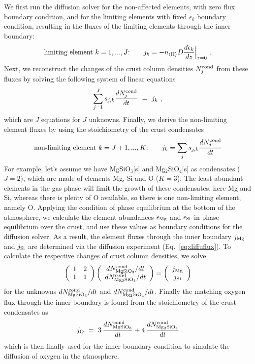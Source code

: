 \documentclass[11pt]{article}
\def\nH{n_{\langle\rm H\rangle}}
\def\ek{\epsilon_k}
\begin{document}
We first run the diffusion solver for the non-affected elements, with
zero flux boundary condition, and for the limiting elements 
with fixed $\ek$ boundary condition, resulting in the fluxes
of the limiting elements through the inner boundary:
\begin{equation}
  \mbox{limiting element $k=1,...,J$:}\quad\quad 
   j_k = -\nH D \frac{d\ek}{dz}\Big|_{z=0} \ .
  \label{eq:diffuflux}
\end{equation}
Next, we reconstruct the changes of the crust column densities
$N_j^{\rm cond}$ from these fluxes by solving the following system of
linear equations
\begin{equation}
  \sum_{j=1}^J s_{j,k} \frac{dN_j^{\rm cond}}{dt} ~=~ j_k \ ,
\end{equation}
which are $J$ equations for $J$ unknowns. Finally, we derive the
non-limiting element fluxes by using the stoichiometry of the 
crust condensates
\begin{equation}
  \mbox{non-limiting element $k=J+1,...,K$:}\quad\quad 
  j_k = \sum_j s_{j,k} \frac{dN_j^{\rm cond}}{dt}
\end{equation}
For example, let's assume we have MgSiO$_3$[s] and Mg$_2$SiO$_4$[s] as
condensates ($J=2$), which are made of elements Mg, Si and O
($K=3$). The least abundant elements in the gas phase will limit the
growth of these condensates, here Mg and Si, whereas there is plenty
of O available, so there is one non-limiting element, namely
O. Applying the condition of phase equilibrium at the bottom of the
atmosphere, we calculate the element abundances $\epsilon_{\rm Mg}$
and $\epsilon_{\rm Si}$ in phase equilibrium over the crust, and use
these values as boundary conditions for the diffusion solver. As a
result, the element fluxes through the inner boundary $j_{\rm Mg}$ and
$j_{\rm Si}$ are determined via the diffusion experiment
(Eq.~\ref{eq:diffuflux}). To calculate the respective changes of crust
column densities, we solve
\begin{equation}
  \left(\begin{array}{cc} 1 & 2 \\ 
                          1 & 1 \end{array}\right)
  \left(\begin{array}{c} dN_{\rm MgSiO_3}^{\rm cond}/dt \\ 
                         dN_{\rm Mg_2SiO_4}^{\rm cond}/dt \end{array}\right)
  = 
  \left(\begin{array}{c} j_{\rm Mg} \\ j_{\rm Si}\end{array}\right)
\end{equation}
for the unknowns $dN_{\rm MgSiO_3}^{\rm cond}/dt$ and $dN_{\rm Mg_2SiO_4}^{\rm
  cond}/dt$. Finally the matching oxygen flux through the inner 
boundary is found from the stoichiometry of the crust condensates as
\begin{equation}
  j_{\rm O} ~=~ 3\, \frac{dN_{\rm MgSiO_3}^{\rm cond}}{dt}
             + 4\, \frac{dN_{\rm Mg_2SiO_4}^{\rm cond}}{dt}
\end{equation}
which is then finally used for the inner boundary condition to simulate
the diffusion of oxygen in the atmosphere.
\end{document}

